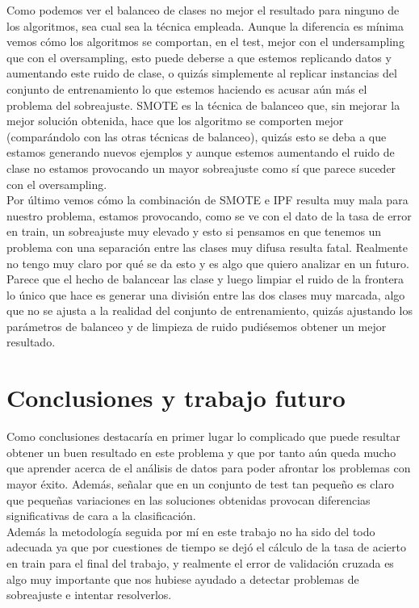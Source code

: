 \documentclass[10pt,a4paper]{article}
\begin{document}
Como podemos ver el balanceo de clases no mejor el resultado para ninguno de los algoritmos, sea cual sea la técnica empleada. Aunque la diferencia es mínima vemos cómo los algoritmos se comportan, en el test, mejor con el undersampling que con el oversampling, esto puede deberse a que estemos replicando datos y aumentando este ruido de clase, o quizás simplemente al replicar instancias del conjunto de entrenamiento lo que estemos haciendo es acusar aún más el problema del sobreajuste. SMOTE es la técnica de balanceo que, sin mejorar la mejor solución obtenida, hace que los algoritmo se comporten mejor (comparándolo con las otras técnicas de balanceo), quizás esto se deba a que estamos generando nuevos ejemplos y aunque estemos aumentando el ruido de clase no estamos provocando un mayor sobreajuste como sí que parece suceder con el oversampling.\\

Por último vemos cómo la combinación de SMOTE e IPF resulta muy mala para nuestro problema, estamos provocando, como se ve con el dato de la tasa de error en train, un sobreajuste muy elevado y esto si pensamos en que tenemos un problema con una separación entre las clases muy difusa resulta fatal. Realmente no tengo muy claro por qué se da esto y es algo que quiero analizar en un futuro. Parece que el hecho de balancear las clase y luego limpiar el ruido de la frontera lo único que hace es generar una división entre las dos clases muy marcada, algo que no se ajusta a la realidad del conjunto de entrenamiento, quizás ajustando los parámetros de balanceo y de limpieza de ruido pudiésemos obtener un mejor resultado.

\section{Conclusiones y trabajo futuro}

Como conclusiones destacaría en primer lugar lo complicado que puede resultar obtener un buen resultado en este problema y que por tanto aún queda mucho que aprender acerca de el análisis de datos para poder afrontar los problemas con mayor éxito. Además, señalar que en un conjunto de test tan pequeño es claro que pequeñas variaciones en las soluciones obtenidas provocan diferencias significativas de cara a la clasificación.\\

Además la metodología seguida por mí en este trabajo no ha sido del todo adecuada ya que por cuestiones de tiempo se dejó el cálculo de la tasa de acierto en train para el final del trabajo, y realmente el error de validación cruzada es algo muy importante que nos hubiese ayudado a detectar problemas de sobreajuste e intentar resolverlos.\\
\end{document}

